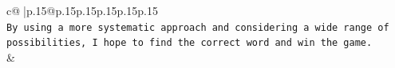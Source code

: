 \documentclass{article}
\begin{document}
{\begin{supertabular}{c@{$\;$}|p{.15\linewidth}@{}p{.15\linewidth}p{.15\linewidth}p{.15\linewidth}p{.15\linewidth}p{.15\linewidth}}
{{{\\ 
\texttt{By using a more systematic approach and considering a wide range of possibilities, I hope to find the correct word and win the game.} \\
            }
        }
    }
    & \\ \\

\end{supertabular}
}
\end{document}
